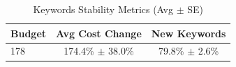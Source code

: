 \begin{table}[htbp]
\centering
\caption{Keywords Stability Metrics (Avg $\pm$ SE)}
\begin{tabular}{lcc}
\toprule
Budget & Avg Cost Change & New Keywords \\
\midrule
178 & 174.4\% $\pm$ 38.0\% & 79.8\% $\pm$ 2.6\% \\
\bottomrule
\end{tabular}
\end{table}